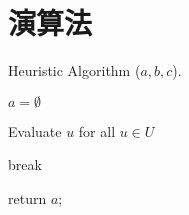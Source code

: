 \chapter{演算法}\label{algorithm}

\begin{algorithm}[htb]
    \caption{ Heuristic Algorithm ($a,b,c$).}
    \label{alg:main}
    \begin{algorithmic}[1]

    \State $a = \emptyset$

        \State Evaluate $u$ for all $u \in U$



            \State break

        \EndIf

    \EndWhile
    \State return $a$;

    \end{algorithmic}
\end{algorithm}